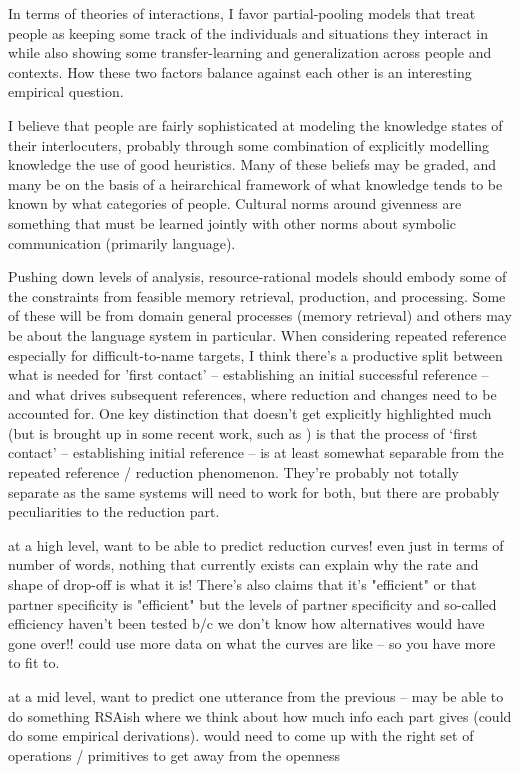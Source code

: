 \documentclass[]{article}
\begin{document}
	In terms of theories of interactions, I favor partial-pooling models that treat people as keeping some track of the individuals and situations they interact in while also showing some transfer-learning and generalization across people and contexts. How these two factors balance against each other is an interesting empirical question. 
	
	I believe that people are fairly sophisticated at modeling the knowledge states of their interlocuters, probably through some combination of explicitly modelling knowledge the use of good heuristics. Many of these beliefs may be graded, and many be on the basis of a heirarchical framework of what knowledge tends to be known by what categories of people.  Cultural norms around givenness are something that must be learned jointly with other norms about symbolic communication (primarily language). 
	
	Pushing down levels of analysis, resource-rational models should embody some of the constraints from feasible memory retrieval, production, and processing. Some of these will be from domain general processes (memory retrieval) and others may be about the language system in particular. 
	When considering repeated reference especially for difficult-to-name targets, I think there's a productive split between what is needed for 'first contact' -- establishing an initial successful reference -- and what drives subsequent references, where reduction and changes need to be accounted for. One key distinction that doesn't get explicitly highlighted much (but is brought up in some recent work, such as \cite{leung2023}) is that the process of `first contact' -- establishing initial reference -- is at least somewhat separable from the repeated reference / reduction phenomenon. They're probably not totally separate as the same systems will need to work for both, but there are probably peculiarities to the reduction part. 
	
	at a high level, want to be able to predict reduction curves! even just in terms of number of words, nothing that currently exists can explain why the rate and shape of drop-off is what it is! There's also claims that it's "efficient" or that partner specificity is "efficient" but the levels of partner specificity and so-called efficiency haven't been tested b/c we don't know how alternatives would have gone over!! could use more data on what the curves are like -- so you have more to fit to. 
	
	at a mid level, want to predict one utterance from the previous -- may be able to do something RSAish where we think about how much info each part gives (could do some empirical derivations). would need to come up with the right set of operations / primitives to get away from the openness
	
\end{document}
